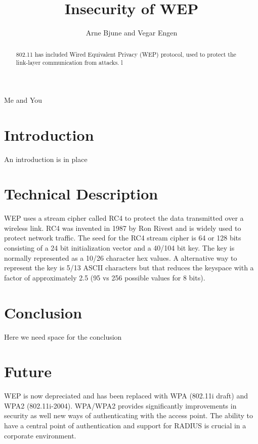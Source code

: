 \documentclass[twocolumn]{IEEEtran}
\begin{document}
\title{Insecurity of WEP}


\author{Arne Bjune and Vegar Engen}

{Me and You}

\maketitle

\begin{abstract}
802.11 has included Wired Equivalent Privacy (WEP) protocol, used to protect the link-layer communication from attacks.  l
\end{abstract}

\section {Introduction}
\label{sec:introduction}

An introduction is in place




\section {Technical Description}
\label{sec:technical_description}

WEP uses a stream cipher called RC4 to protect the data transmitted over a wireless link. RC4 was invented in 1987 by Ron Rivest and is widely used to protect network traffic. The seed for the RC4 stream cipher is 64 or 128 bits consisting of a 24 bit initialization vector and a 40/104 bit key. The key is normally represented as a 10/26 character hex values. A alternative way to represent the key is 5/13 ASCII characters but that reduces the keyspace with a factor of approximately 2.5 (95 vs 256 possible values for 8 bits).





\section {Conclusion}
\label{sec:conclusion}

Here we need space for the conclusion



\section {Future}
\label{sec:future}

WEP is now depreciated and has been replaced with WPA (802.11i draft) and WPA2 (802.11i-2004). WPA/WPA2 provides significantly improvements in security as well new ways of authenticating with the access point. The ability to have a central point  of authentication and support for RADIUS is crucial in a corporate environment.






\end{document}
